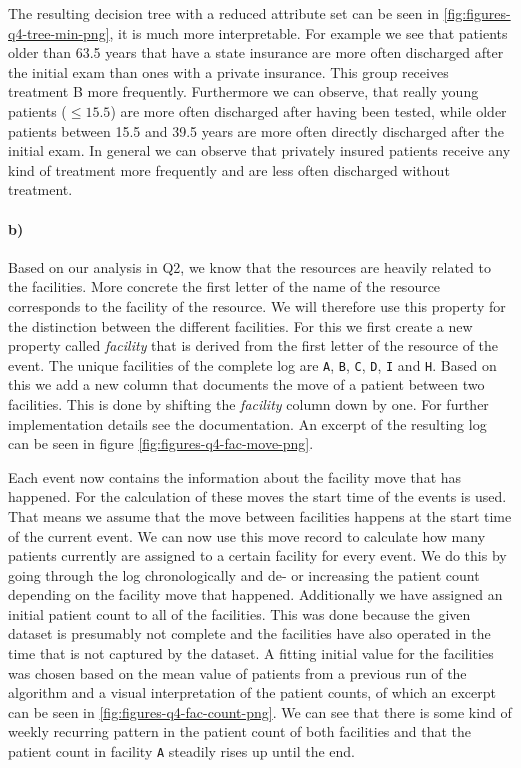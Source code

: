 \documentclass[12pt]{report}
\begin{document}
The resulting decision tree with a reduced attribute set can be seen in \ref{fig:figures-q4-tree-min-png}, it is much more interpretable. For example we see that patients older than 63.5 years that have a state insurance are more often discharged after the initial exam than ones with a private insurance. This group receives treatment B more frequently.
Furthermore we can observe, that really young patients ($\leq15.5$) are more often discharged after having been tested, while older patients between 15.5 and 39.5 years are more often directly discharged after the initial exam.
In general we can observe that privately insured patients receive any kind of treatment more frequently and are less often discharged without treatment.

\paragraph{b)} 
Based on our analysis in Q2, we know that the resources are heavily related to the facilities. More concrete the first letter of the name of the resource corresponds to the facility of the resource. We will therefore use this property for the distinction between the different facilities.
For this we first create a new property called \emph{facility} that is derived from the first letter of the resource of the event. The unique facilities of the complete log are \texttt{A}, \texttt{B}, \texttt{C}, \texttt{D}, \texttt{I} and \texttt{H}. Based on this we add a new column that documents the move of a patient between two facilities. This is done by shifting the \emph{facility} column down by one. For further implementation details see the documentation. An excerpt of the resulting log can be seen in figure \ref{fig:figures-q4-fac-move-png}.

Each event now contains the information about the facility move that has happened. For the calculation of these moves the start time of the events is used. That means we assume that the move between facilities happens at the start time of the current event. We can now use this move record to calculate how many patients currently are assigned to a certain facility for every event. We do this by going through the log chronologically and de- or increasing the patient count depending on the facility move that happened. Additionally we have assigned an initial patient count to all of the facilities. This was done because the given dataset is presumably not complete and the facilities have also operated in the time that is not captured by the dataset. A fitting initial value for the facilities was chosen based on the mean value of patients from a previous run of the algorithm and a visual interpretation of the patient counts, of which an excerpt can be seen in \ref{fig:figures-q4-fac-count-png}. We can see that there is some kind of weekly recurring pattern in the patient count of both facilities and that the patient count in facility \texttt{A} steadily rises up until the end.
\end{document}
